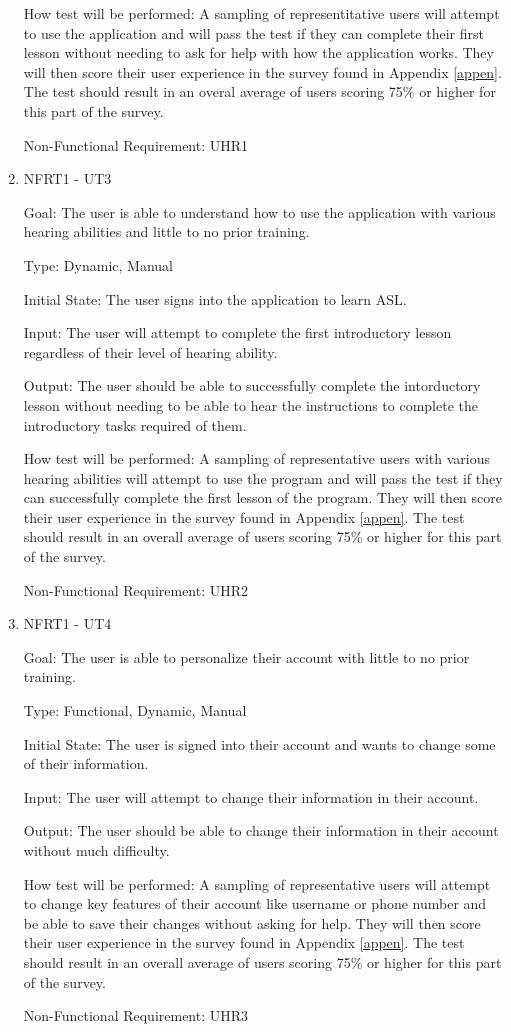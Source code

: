 \documentclass[12pt, titlepage]{article}
\begin{document}
\begin{enumerate}
How test will be performed: A sampling of representitative users will attempt to use the application and will pass the test if they can complete their first lesson without needing to ask for help with how the application works. They will then score their user experience in the survey found in Appendix \ref{appen}. The test should result in an overal average of users scoring 75\% or higher for this part of the survey. 

Non-Functional Requirement: UHR1
					
\item{NFRT1 - UT3}

Goal: The user is able to understand how to use the application with various hearing abilities and little to no prior training. 

Type: Dynamic, Manual
					
Initial State: The user signs into the application to learn ASL.
					
Input: The user will attempt to complete the first introductory lesson regardless of their level of hearing ability.
					
Output: The user should be able to successfully complete the intorductory lesson without needing to be able to hear the instructions to complete the introductory tasks required of them. 
					
How test will be performed: A sampling of representative users with various hearing abilities will attempt to use the program and will pass the test if they can successfully complete the first lesson of the program. They will then score their user experience in the survey found in Appendix \ref{appen}. The test should result in an overall average of users scoring 75\% or higher for this part of the survey. 

Non-Functional Requirement: UHR2

\item{NFRT1 - UT4}

Goal: The user is able to personalize their account with little to no prior training. 

Type: Functional, Dynamic, Manual
					
Initial State: The user is signed into their account and wants to change some of their information.
					
Input: The user will attempt to change their information in their account. 
					
Output: The user should be able to change their information in their account without much difficulty. 
					
How test will be performed: A sampling of representative users will attempt to change key features of their account like username or phone number and be able to save their changes without asking for help. They will then score their user experience in the survey found in Appendix \ref{appen}. The test should result in an overall average of users scoring 75\% or higher for this part of the survey.

Non-Functional Requirement: UHR3

\end{enumerate}
\end{document}
